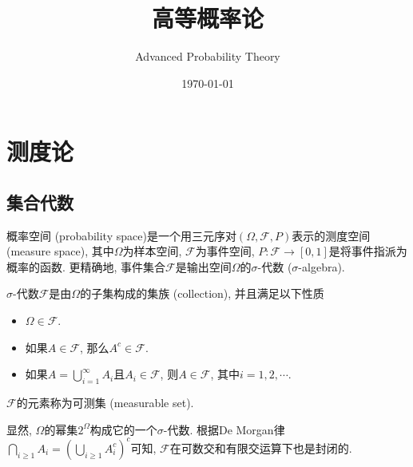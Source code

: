 \documentclass[cn, 12pt, math=mtpro2, bibstyle=apa, blue, twocol]{elegantbook}
\title{高等概率论}
\subtitle{Advanced Probability Theory}
\date{\today}
\newcommand{\F}{\mathcal{F}}
\newcommand{\PP}{P}
\begin{document}
\maketitle
\frontmatter

\tableofcontents

\mainmatter

\chapter{测度论}
\section{集合代数}

概率空间 (probability space)是一个用三元序对$(\Omega,\F,\PP)$表示的测度空间 (measure space), 其中$\Omega$为样本空间, $\F$为事件空间, $\PP:\F\to[0,1]$是将事件指派为概率的函数. 更精确地, 事件集合$\F$是输出空间$\Omega$的$\sigma$-代数 ($\sigma$-algebra).

\begin{definition}
$\sigma$-代数$\F$是由$\Omega$的子集构成的集族 (collection), 并且满足以下性质
\begin{itemize}
  \item $\Omega\in\F$.
  \item 如果$A\in\F$, 那么$A^c\in\F$.
  \item 如果$A=\bigcup_{i=1}^\infty A_i$且$A_i\in\F$, 则$A\in\F$, 其中$i=1,2,\cdots$.
\end{itemize}
$\F$的元素称为可测集 (measurable set).
\end{definition}

显然, $\Omega$的幂集$2^\Omega$构成它的一个$\sigma$-代数. 根据De Morgan律$\bigcap_{i\ge1} A_i=(\bigcup_{i\ge1} A_i^c)^c$可知, $\F$在可数交和有限交运算下也是封闭的.
\end{document}
